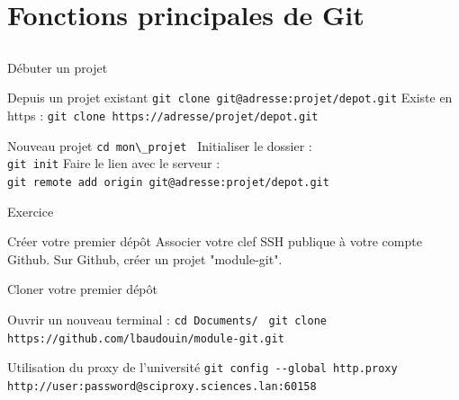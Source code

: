 \documentclass{beamer}
\begin{document}
\section{Fonctions principales de Git}
\subsection{}

\begin{frame}[fragile]{Débuter un projet}

  \begin{block}{Depuis un projet existant}
    \textcolor{commandcolor}{\verb?git clone git@adresse:projet/depot.git?}\linebreak
    Existe en https :\linebreak
    \textcolor{commandcolor}{\verb?git clone https://adresse/projet/depot.git?}
  \end{block}
  \begin{block}{Nouveau projet}
    \textcolor{commandcolor}{\verb?cd mon\_projet ?}\linebreak
    Initialiser le dossier :\\
    \textcolor{commandcolor}{\verb?git init?}\linebreak
    Faire le lien avec le serveur :\\
    \textcolor{commandcolor}{\verb?git remote add origin git@adresse:projet/depot.git?}
  \end{block}
\end{frame}

\begin{frame}[fragile]{Exercice}
  
  
  \begin{exampleblock}{Créer votre premier dépôt}
    Associer votre clef SSH publique à votre compte Github.\linebreak
    Sur Github, créer un projet "module-git".%
  \end{exampleblock}
  
  \begin{exampleblock}{Cloner votre premier dépôt}
    \begin{small}
      Ouvrir un nouveau terminal :\linebreak
      \textcolor{commandcolor}{\verb?cd Documents/ ?}\linebreak
      \textcolor{commandcolor}{\verb?git clone https://github.com/lbaudouin/module-git.git ?}
    \end{small}
  \end{exampleblock}
  
  \begin{alertblock}{Utilisation du proxy de l'université}
      \textcolor{commandcolor}{\verb?git config --global http.proxy  http://user:password@sciproxy.sciences.lan:60158?}
  \end{alertblock}
  
\end{frame}
\end{document}
